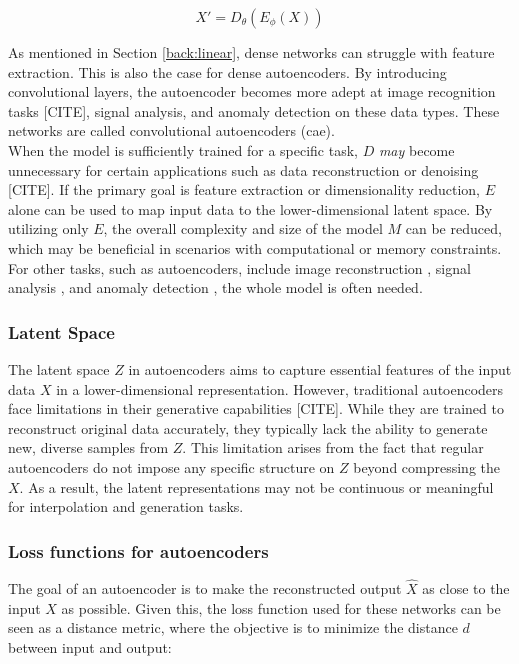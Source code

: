 \begin{equation}
    X' = D_\theta(E_\phi(X))
\end{equation}

As mentioned in Section \ref{back:linear}, dense networks can struggle with feature extraction. This is also the case for dense autoencoders. By introducing convolutional layers, the autoencoder becomes more adept at image recognition tasks [CITE], signal analysis, and anomaly detection on these data types. These networks are called convolutional autoencoders (\acrshort{cae}).  \\

When the model is sufficiently trained for a specific task, $D$ \textit{may} become unnecessary for certain applications such as data reconstruction or denoising [CITE]. If the primary goal is feature extraction or dimensionality reduction, $E$ alone can be used to map input data to the lower-dimensional latent space. By utilizing only $E$, the overall complexity and size of the model $M$ can be reduced, which may be beneficial in scenarios with computational or memory constraints. For other tasks, such as autoencoders, include image reconstruction \cite{7797236}, signal analysis \cite{andrysiak2016machine}, and anomaly detection \cite{bank2021autoencoders}, the whole model is often needed.
\subsubsection{Latent Space}

The latent space $Z$ in autoencoders aims to capture essential features of the input data $X$ in a lower-dimensional representation. However, traditional autoencoders face limitations in their generative capabilities [CITE]. While they are trained to reconstruct original data accurately, they typically lack the ability to generate new, diverse samples from $Z$.
This limitation arises from the fact that regular autoencoders do not impose any specific structure on $Z$ beyond compressing the $X$. As a result, the latent representations may not be continuous or meaningful for interpolation and generation tasks.



\subsubsection{Loss functions for autoencoders}

The goal of an autoencoder is to make the reconstructed output $\hat{X}$ as close to the input $X$ as possible. Given this, the loss function used for these networks can be seen as a distance metric, where the objective is to minimize the distance $d$ between input and output:

